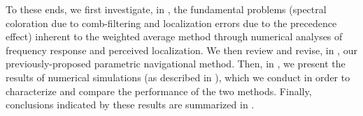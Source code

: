 To these ends, we first investigate, in , the fundamental problems (spectral coloration due to comb-filtering and localization errors due to the precedence effect) inherent to the weighted average method through numerical analyses of frequency response and perceived localization.
We then review and revise, in , our previously-proposed parametric navigational method.
Then, in , we present the results of numerical simulations (as described in ), which we conduct in order to characterize and compare the performance of the two methods.
Finally, conclusions indicated by these results are summarized in .